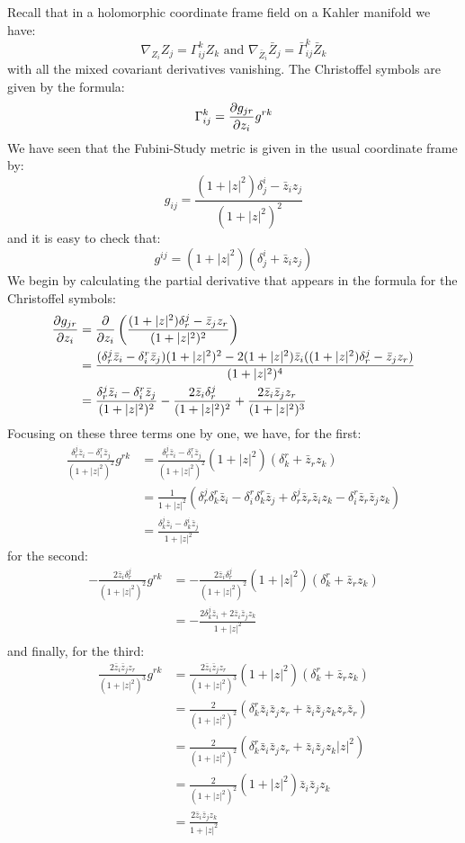 Recall that in a holomorphic coordinate frame field on a Kahler manifold we have:
%
$$\nabla_{ Z_i }{ Z_j }= \Gamma^k_{ij} Z_k \text{ and } \nabla_{ \bar{Z}_i }{ \bar{Z}_j } = \bar{ \Gamma }^k_{ij} \bar{Z}_k $$
%
with all the mixed covariant derivatives vanishing.  The Christoffel symbols are given by the formula:
%
$$ \Gamma^k_{ij} = \frac{ \partial g_{jr} }{\partial z_i} g^{rk} $$
%
We have seen that the Fubini-Study metric is given in the usual coordinate frame by:
%
$$ g_{ij} = \frac{ (1 + |z|^2)\delta^i_j - \bar{z}_i z_j }{ (1 + |z|^2)^2 } $$
%
and it is easy to check that:
%
$$g^{ij} = (1 + |z|^2)( \delta^i_j + \bar{z}_i z_j )$$
%
We begin by calculating the partial derivative that appears in the formula for the Christoffel symbols:
%
\begin{align*}
\frac{ \partial g_{jr} }{\partial z_i} &= \frac{\partial}{ \partial z_i }\left( \frac{ (1 + |z|^2) \delta^j_r - \bar{z}_j z_r }{ (1 + |z|^2)^2 } \right) \\
&= \frac{ ( \delta^j_r \bar{z}_i - \delta^r_i \bar{z}_j ) (1 + |z|^2 )^2 - 2 (1 + |z|^2 ) \bar{z}_i( (1 + |z|^2)\delta^j_r - \bar{z}_j z_r )}{ (1 + |z|^2 )^4 } \\
&= \frac{ \delta^j_r \bar{z}_i - \delta^r_i \bar{z}_j }{ (1 + |z|^2)^2 } - \frac{ 2 \bar{z}_i \delta^j_r }{ (1 + |z|^2)^2 } + \frac{ 2 \bar{z}_i \bar{z}_j z_r }{ (1 + |z|^2)^3 }
\end{align*}
%
Focusing on these three terms one by one, we have, for the first:
%
\begin{align*}
\frac{ \delta^j_r \bar{z}_i - \delta^r_i \bar{z}_j }{ (1 + |z|^2)^2 } g^{rk} &= \frac{ \delta^j_r \bar{z}_i - \delta^r_i \bar{z}_j }{ (1 + |z|^2)^2 } (1 + |z|^2)( \delta^r_k + \bar{z}_r z_k ) \\
&= \frac{1}{ 1 + |z|^2 } ( \delta^j_r \delta^r_k \bar{z}_i - \delta^r_i \delta^r_k \bar{z}_j + \delta^j_r \bar{z}_r \bar{z}_i z_k - \delta^r_i \bar{z}_r \bar{z}_j z_k ) \\
&= \frac{ \delta^j_k \bar{z}_i - \delta^i_k \bar{z}_j }{ 1 + |z|^2 }
\end{align*}
%
for the second:
%
\begin{align*}
- \frac{ 2 \bar{z}_i \delta^j_r }{ (1 + |z|^2)^2 }g^{rk} &= - \frac{ 2 \bar{z}_i \delta^j_r }{ (1 + |z|^2)^2 }(1 + |z|^2)( \delta^r_k + \bar{z}_r z_k ) \\
&= - \frac{2 \delta^j_k \bar{z}_i + 2 \bar{z}_i \bar{z}_j z_k}{1 + |z|^2}\\
\end{align*}
%
and finally, for the third:
%
\begin{align*}
\frac{ 2 \bar{z}_i \bar{z}_j z_r }{ (1 + |z|^2)^3 } g^{rk} &= \frac{ 2 \bar{z}_i \bar{z}_j z_r }{ (1 + |z|^2)^3 } (1 + |z|^2)( \delta^r_k + \bar{z}_r z_k ) \\
&= \frac{2}{(1 + |z|^2)^2}( \delta^r_k \bar{z}_i \bar{z}_j z_r + \bar{z}_i \bar{z}_j z_k z_r \bar{z}_r ) \\
&= \frac{2}{(1 + |z|^2)^2}( \delta^r_k \bar{z}_i \bar{z}_j z_r + \bar{z}_i \bar{z}_j z_k |z|^2 ) \\
&= \frac{2}{(1 + |z|^2)^2}(1 + |z|^2)\bar{z}_i \bar{z}_j z_k  \\
&= \frac{2 \bar{z}_i \bar{z}_j z_k }{1 + |z|^2}
\end{align*}
